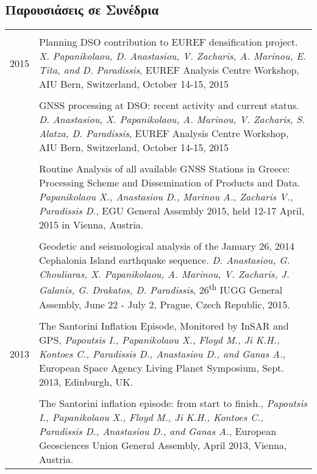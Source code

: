 \documentclass[a4paper,10pt]{article} %
\begin{document}
\subsection*{Παρουσιάσεις σε Συνέδρια}

\begin{longtable}{r|p{14cm}}
\multicolumn{2}{c}{} \\ 
  \textsc{2015}

  & Planning DSO contribution to EUREF densification project.
  \emph{X. Papanikolaou, D. Anastasiou, V. Zacharis, A. Marinou, E. Tita, and D. Paradissis},
  EUREF Analysis Centre Workshop, AIU Bern, Switzerland, October 14-15, 2015\\

  &\\

  & GNSS processing at DSO: recent activity and current status.
  \emph{D. Anastasiou, X. Papanikolaou, A. Marinou, V. Zacharis, S. Alatza, D. Paradissis},
  EUREF Analysis Centre Workshop, AIU Bern, Switzerland, October 14-15, 2015\\

  &\\

  & Routine Analysis of all available GNSS Stations in Greece: Processing Scheme and Dissemination of Products and Data.
  \emph{Papanikolaou X., Anastasiou D., Marinou A., Zacharis V., Paradissis D.},
  EGU General Assembly 2015, held 12-17 April, 2015 in Vienna, Austria.\\

  &\\

  & Geodetic and seismological analysis of the January 26, 2014 Cephalonia Island earthquake sequence.
  \emph{D. Anastasiou, G. Chouliaras, X. Papanikolaou, A. Marinou, V. Zacharis, J. Galanis, G. Drakatos, D. Paradissis},
  26\textsuperscript{th} IUGG General Assembly, June 22 - July 2, Prague, Czech Republic, 2015.\\
  
\multicolumn{2}{c}{} \\
  \textsc{2013}
  & The Santorini Inflation Episode, Monitored by InSAR and GPS,
  \emph{Papoutsis I., Papanikolaou X., Floyd M., Ji K.H., Kontoes C., Paradissis D., Anastasiou D., and Ganas A.},
  European Space Agency Living Planet Symposium, Sept. 2013, Edinburgh, UK.\\

  &\\

  & The Santorini inflation episode: from start to finish.,
  \emph{Papoutsis I., Papanikolaou X., Floyd M., Ji K.H., Kontoes C., Paradissis D., Anastasiou D., and Ganas A.},
  European Geosciences Union General Assembly, April 2013, Vienna, Austria.\\


\end{longtable}
\end{document}
